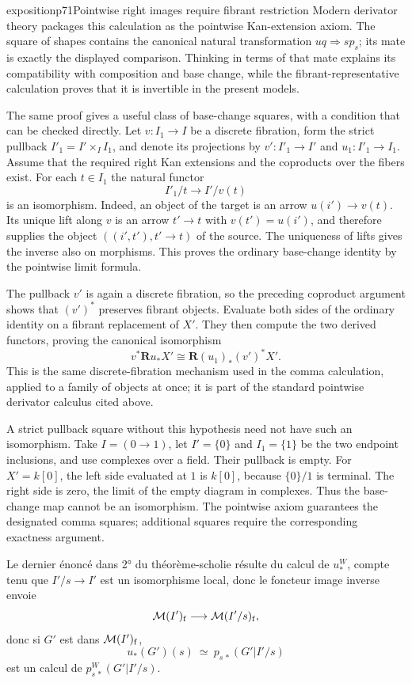 \begin{dcomment}{exposition}{p71}{Pointwise right images require fibrant restriction}
Modern derivator theory packages this calculation as the pointwise Kan-extension axiom. The square of shapes contains the canonical natural transformation $uq\Rightarrow s p_s$; its mate is exactly the displayed comparison. Thinking in terms of that mate explains its compatibility with composition and base change, while the fibrant-representative calculation proves that it is invertible in the present models.

The same proof gives a useful class of base-change squares, with a condition that can be checked directly. Let $v:I_1\to I$ be a discrete fibration, form the strict pullback $I'_1=I'\times_I I_1$, and denote its projections by $v':I'_1\to I'$ and $u_1:I'_1\to I_1$. Assume that the required right Kan extensions and the coproducts over the fibers exist. For each $t\in I_1$ the natural functor
\[
                         I'_1/t\longrightarrow I'/v(t)
\]
is an isomorphism. Indeed, an object of the target is an arrow $u(i')\to v(t)$. Its unique lift along $v$ is an arrow $t'\to t$ with $v(t')=u(i')$, and therefore supplies the object $((i',t'),t'\to t)$ of the source. The uniqueness of lifts gives the inverse also on morphisms. This proves the ordinary base-change identity by the pointwise limit formula.

The pullback $v'$ is again a discrete fibration, so the preceding coproduct argument shows that $(v')^*$ preserves fibrant objects. Evaluate both sides of the ordinary identity on a fibrant replacement of $X'$. They then compute the two derived functors, proving the canonical isomorphism
\[
                      v^*\mathbf Ru_*X'
                     \cong\mathbf R(u_1)_*(v')^*X'.
\]
This is the same discrete-fibration mechanism used in the comma calculation, applied to a family of objects at once; it is part of the standard pointwise derivator calculus cited above.

A strict pullback square without this hypothesis need not have such an isomorphism. Take $I=(0\to1)$, let $I'=\{0\}$ and $I_1=\{1\}$ be the two endpoint inclusions, and use complexes over a field. Their pullback is empty. For $X'=k[0]$, the left side evaluated at $1$ is $k[0]$, because $\{0\}/1$ is terminal. The right side is zero, the limit of the empty diagram in complexes. Thus the base-change map cannot be an isomorphism. The pointwise axiom guarantees the designated comma squares; additional squares require the corresponding exactness argument.
\end{dcomment}


Le dernier énoncé dans 2° du théorème-scholie résulte du calcul de $u_*^W$, compte tenu que $I'/s \longrightarrow I'$ est un isomorphisme local, donc le foncteur image inverse envoie
\[
\mathcal{M}(I')_{\mathrm{f}} \longrightarrow \mathcal{M}(I'/s)_{\mathrm{f}},
\]
donc si $G'$ est dans $\mathcal{M}(I')_{\mathrm{f}}$,
\[
u_*(G')(s) \ \simeq\ p_{s\,*}(G'|I'/s)
\]
est un calcul de $p^W_{s\,*}(G'|I'/s)$.

